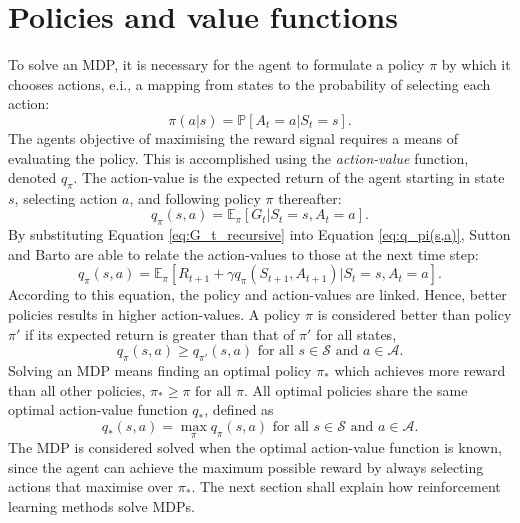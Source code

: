 \section{Policies and value functions}
To solve an MDP, it is necessary for the agent to formulate a policy $\pi$ by which it chooses actions, e.i., a mapping from states to the probability of selecting each action:
\begin{equation}
\pi(a|s) = \mathbb{P} [A_t=a | S_t=s].
\label{eq:pi(a|s)}
\end{equation}
The agents objective of maximising the reward signal requires a means of evaluating the policy.
This is accomplished using the \emph{action-value} function, denoted $q_\pi$.
The action-value is the expected return of the agent starting in state $s$, selecting action $a$, and following policy $\pi$ thereafter:
\begin{equation}
q_\pi(s,a) = \mathbb{E}_{\pi} [G_t | S_t=s, A_t=a].
\label{eq:q_pi(s,a)}
\end{equation}
By substituting Equation \ref{eq:G_t_recursive} into Equation \ref{eq:q_pi(s,a)}, Sutton and Barto are able to relate the action-values to those at the next time step:
\begin{equation}
q_\pi(s,a) = \mathbb{E}_{\pi} [R_{t+1} + \gamma q_{\pi}(S_{t+1}, A_{t+1}) | S_t = s, A_t=a].
\label{eq:q_pi(s,a)_1}
\end{equation}
According to this equation, the policy and action-values are linked. 
Hence, better policies results in higher action-values.
A policy $\pi$ is considered better than policy $\pi'$ if its expected return is greater than that of $\pi'$ for all states, 
\begin{equation}\label{eq:better_policy_cond}
    q_\pi(s,a) \geq q_{\pi'}(s,a) \text{ for all } s \in \mathcal{S} \text{ and } a \in \mathcal{A}.
\end{equation}
Solving an MDP means finding an optimal policy $\pi_*$ which achieves more reward than all other policies,
$\pi_* \geq \pi \text{ for all } \pi$. All optimal policies share the same optimal action-value function $q_*$, defined as 
\begin{equation}
    q_*(s,a)=\max_\pi q_\pi(s,a) \text{ for all } s \in \mathcal{S} \text{ and } a \in \mathcal{A}.
\label{eq:q_*(s,a)}
\end{equation}
The MDP is considered solved when the optimal action-value function is known, since the agent can achieve the maximum possible reward by always selecting actions that maximise over $\pi_*$.
The next section shall explain how reinforcement learning methods solve MDPs.




